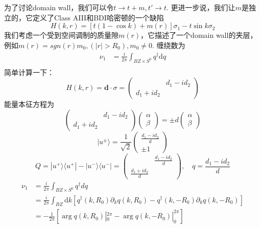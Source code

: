\documentclass[a4paper]{article}
\numberwithin{equation}{subsection}
\begin{document}
为了讨论domain wall，我们可以令$t\rightarrow t+m,t'\rightarrow t$. 更进一步说，我们让$m$是独立的，它定义了Class AIII和BDI哈密顿的一个缺陷
\begin{equation}
    H(k,r)=[t(1-\cos k)+m(r)]\sigma_1-t\sin k\sigma_2
\end{equation}
我们考虑一个受到空间调制的质量隙$m(r)$，它描述了一个domain wall的夹层，例如$m(r)=sgn(r)m_0,(|r|>R_0),m_0\neq 0$. 缠绕数为
\begin{equation}
    \begin{split}
        \nu_1&=\frac{i}{2\pi}\int_{BZ\times S^0}q^\dagger\mathrm{d}q\\
    \end{split}
\end{equation}
简单计算一下：
\begin{equation}
    H(k,r)=\mathbf{d}\cdot \sigma=\begin{pmatrix}
        &d_1-id_2\\
        d_1+id_2&
    \end{pmatrix}
\end{equation}
能量本征方程为
\begin{equation}
    \begin{pmatrix}
        &d_1-id_2\\
        d_1+id_2&
    \end{pmatrix}\begin{pmatrix}
        \alpha\\
        \beta
    \end{pmatrix}=\pm d\begin{pmatrix}
        \alpha\\
        \beta
    \end{pmatrix}
\end{equation}
\begin{equation}
    |u^\pm\rangle=\frac{1}{\sqrt{2}}\begin{pmatrix}
        \frac{d_1-id_2}{d}\\
        \pm 1
    \end{pmatrix}
\end{equation}
\begin{equation}
    Q=|u^+\rangle\langle u^+|-|u^-\rangle\langle u^-|=\begin{pmatrix}
        &\frac{d_1-id_2}{d}\\
        \frac{d_1+id_2}{d}&
    \end{pmatrix},\quad q=\frac{d_1-id_2}{d}
\end{equation}
\begin{equation}
    \begin{split}
        \nu_1&=\frac{i}{2\pi}\int_{BZ\times S^0}q^\dagger dq\\
        &=\frac{i}{2\pi}\int_{BZ}\mathrm{d}k[q^\dagger(k,R_0)\partial_k q(k,R_0)-q^\dagger(k,-R_0)\partial_k q(k,-R_0)]\\
        &=-\frac{1}{2\pi}[\arg q(k,R_0)|_0^{2\pi}-\arg q(k,-R_0)|_0^{2\pi}]
    \end{split}
\end{equation}
\end{document}
